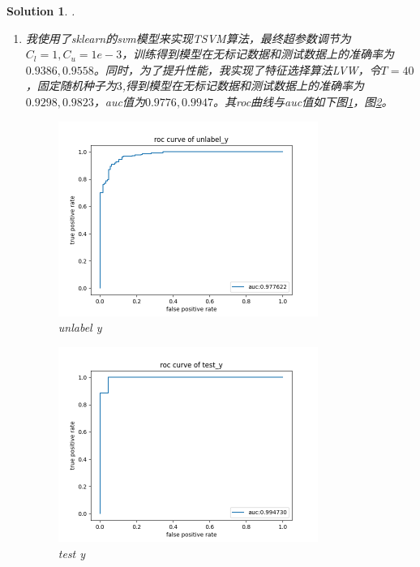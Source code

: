 \documentclass[a4paper,UTF8]{article}
\newtheorem*{solution}{Solution}
\numberwithin{equation}{section}
\begin{document}
\begin{solution}.
	\begin{enumerate}[$\bullet$]
		\item 我使用了sklearn的svm模型来实现TSVM算法，最终超参数调节为$C_l=1,C_u=1e-3$，训练得到模型在无标记数据和测试数据上的准确率为$0.9386,0.9558$。同时，为了提升性能，我实现了特征选择算法LVW，令$T=40$，固定随机种子为$3$,得到模型在无标记数据和测试数据上的准确率为$0.9298,0.9823$，auc值为$0.9776,0.9947$。其roc曲线与auc值如下图\ref{fig:unlabel y}，图\ref{fig:test y}。
		\begin{figure}[h]
			\centering
			\includegraphics[width=0.8\textwidth]{Figure_1.png}
			\caption{unlabel y}
			\label{fig:unlabel y}
		\end{figure}
	    \begin{figure}[h]
	    	\centering
	    	\includegraphics[width=0.8\textwidth]{Figure_2.png}
	    	\caption{test y}
	    	\label{fig:test y}
	    \end{figure}
	\end{enumerate}
\end{solution}
\end{document}
